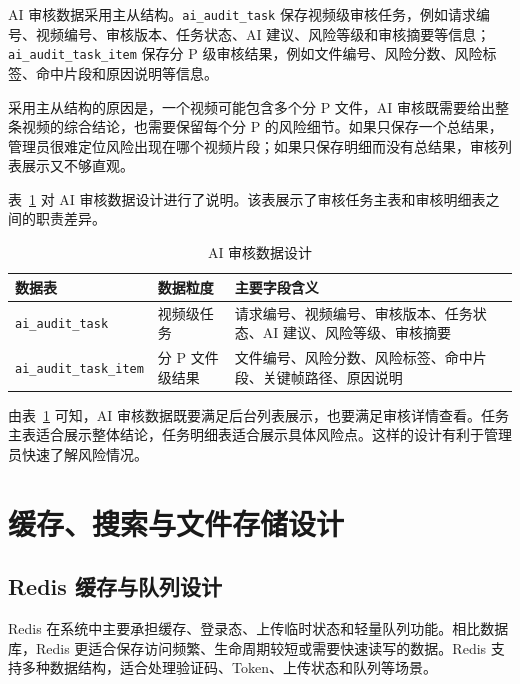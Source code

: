 AI 审核数据采用主从结构。\texttt{ai\_audit\_task} 保存视频级审核任务，例如请求编号、视频编号、审核版本、任务状态、AI 建议、风险等级和审核摘要等信息；\texttt{ai\_audit\_task\_item} 保存分 P 级审核结果，例如文件编号、风险分数、风险标签、命中片段和原因说明等信息。

采用主从结构的原因是，一个视频可能包含多个分 P 文件，AI 审核既需要给出整条视频的综合结论，也需要保留每个分 P 的风险细节。如果只保存一个总结果，管理员很难定位风险出现在哪个视频片段；如果只保存明细而没有总结果，审核列表展示又不够直观。

表~\ref{tab:ai-audit-data-design} 对 AI 审核数据设计进行了说明。该表展示了审核任务主表和审核明细表之间的职责差异。

\begin{table}[htbp]
  \centering
  \caption{AI 审核数据设计}
  \label{tab:ai-audit-data-design}
  \begin{tabular}{p{}p{}p{}}
    \hline
    \textbf{数据表} & \textbf{数据粒度} & \textbf{主要字段含义} \\
    \hline
    \texttt{ai\_audit\_task} & 视频级任务 & 请求编号、视频编号、审核版本、任务状态、AI 建议、风险等级、审核摘要 \\
    \texttt{ai\_audit\_task\_item} & 分 P 文件级结果 & 文件编号、风险分数、风险标签、命中片段、关键帧路径、原因说明 \\
    \hline
  \end{tabular}
\end{table}

由表~\ref{tab:ai-audit-data-design} 可知，AI 审核数据既要满足后台列表展示，也要满足审核详情查看。任务主表适合展示整体结论，任务明细表适合展示具体风险点。这样的设计有利于管理员快速了解风险情况。

\section{缓存、搜索与文件存储设计}
\label{sec:cache-search-file-design}

\subsection{Redis 缓存与队列设计}
\label{subsec:redis-design}

Redis 在系统中主要承担缓存、登录态、上传临时状态和轻量队列功能。相比数据库，Redis 更适合保存访问频繁、生命周期较短或需要快速读写的数据。Redis 支持多种数据结构，适合处理验证码、Token、上传状态和队列等场景\cite{redisdocs}。

